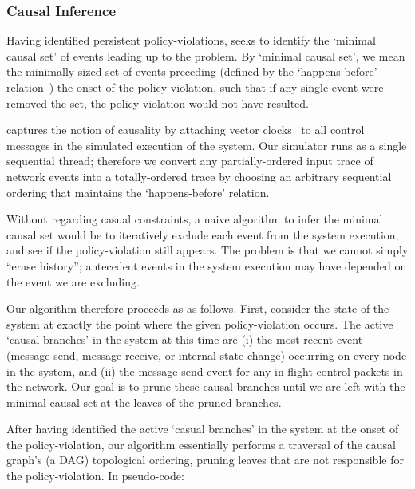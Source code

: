 \subsubsection{\bf Causal Inference} Having identified persistent
policy-violations, \simulator{} seeks to identify the `minimal causal set' of
events leading up to the problem. By `minimal causal set', we mean
the minimally-sized set of events preceding (defined by the `happens-before'
relation~\cite{Lamport:1978:TCO:359545.359563}) the onset of the policy-violation, such that
if any single event were removed the set, the policy-violation would not have resulted.

\Simulator{} captures the notion of causality by attaching vector clocks~\cite{Mattern89virtualtime} to
all control messages in the simulated execution of the system. Our
simulator runs as a single sequential thread; therefore we convert any partially-ordered input trace
of network events into a totally-ordered trace by choosing an arbitrary
sequential ordering that maintains the `happens-before'
relation.

Without regarding casual constraints, a naive algorithm to infer the minimal
causal set would be to iteratively
exclude each event from the system execution, and see if the policy-violation
still appears. The problem is that we cannot simply ``erase history'';
antecedent events in the system execution may have depended on the event we
are excluding.

Our algorithm therefore proceeds as as follows. First, consider
the state of the system at exactly the point where the given policy-violation
occurs. The active `causal branches' in the system at this time are (i) the
most recent event (message send, message receive, or internal state change)
occurring on every node in the system, and (ii) the message send event for any
in-flight control packets in the network. Our goal is to prune these causal
branches until we are left with the minimal causal set at the leaves of the
pruned branches.


After having identified the active `casual branches' in the system at the
onset of the policy-violation, our algorithm essentially performs a
traversal of the causal graph's (a DAG) topological ordering, pruning leaves that are not
responsible for the policy-violation. In pseudo-code:

